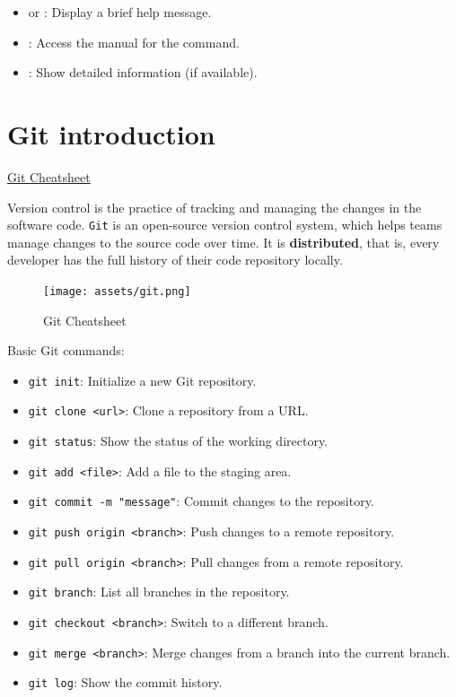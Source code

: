 \begin{tipsblock}
    \begin{itemize}
        \item {} or : Display a brief help message.
        \item {}: Access the manual for the command.
        \item {}: Show detailed information (if available).
    \end{itemize}
\end{tipsblock}


\newpage
\section{Git introduction}

\href{https://ndpsoftware.com/git-cheatsheet.html#loc=workspace}{Git Cheatsheet}

Version control is the practice of tracking and managing the changes in the software code. \texttt{Git} is an open-source version control system, 
which helps teams manage changes to the source code over time. It is \textbf{distributed}, that is, every developer has the full history of their code repository locally.

\begin{figure}[H]
    \centering
    \texttt{[image: assets/git.png]}
    \caption{Git Cheatsheet}
    \label{fig:git_cs}
\end{figure}

Basic Git commands:
\begin{itemize}
    \item \texttt{git init}: Initialize a new Git repository.
    \item \texttt{git clone <url>}: Clone a repository from a URL.
    \item \texttt{git status}: Show the status of the working directory.
    \item \texttt{git add <file>}: Add a file to the staging area.
    \item \texttt{git commit -m "message"}: Commit changes to the repository.
    \item \texttt{git push origin <branch>}: Push changes to a remote repository.
    \item \texttt{git pull origin <branch>}: Pull changes from a remote repository.
    \item \texttt{git branch}: List all branches in the repository.
    \item \texttt{git checkout <branch>}: Switch to a different branch.
    \item \texttt{git merge <branch>}: Merge changes from a branch into the current branch.
    \item \texttt{git log}: Show the commit history.
\end{itemize}



